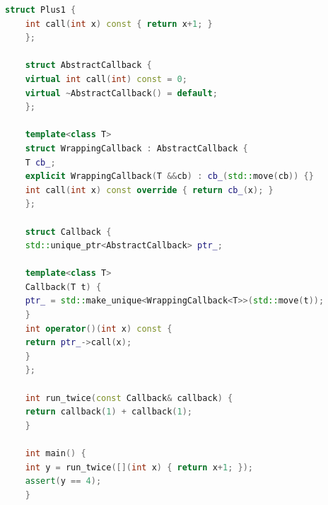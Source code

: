 \documentclass[a4paper,12pt,twoside]{book}
\begin{document}
\begin{itemize}
	\begin{lstlisting}[frame=single, language=c++]
	struct Plus1 {
	int call(int x) const { return x+1; }
	};
	
	struct AbstractCallback {
	virtual int call(int) const = 0;
	virtual ~AbstractCallback() = default;
	};
	
	template<class T>
	struct WrappingCallback : AbstractCallback {
	T cb_;
	explicit WrappingCallback(T &&cb) : cb_(std::move(cb)) {}
	int call(int x) const override { return cb_(x); }
	};
	
	struct Callback {
	std::unique_ptr<AbstractCallback> ptr_;
	
	template<class T>
	Callback(T t) {
	ptr_ = std::make_unique<WrappingCallback<T>>(std::move(t));
	}
	int operator()(int x) const {
	return ptr_->call(x);
	}
	};
	
	int run_twice(const Callback& callback) {
	return callback(1) + callback(1);
	}
	
	int main() {
	int y = run_twice([](int x) { return x+1; });
	assert(y == 4);
	}
	\end{lstlisting}
	
\end{itemize}
\end{document}

